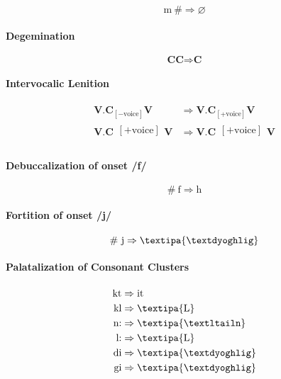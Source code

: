 \documentclass{report}
\begin{document}
\begin{equation}
  \text{m}\ \# \Rightarrow \varnothing
\end{equation}

\paragraph{Degemination}

\begin{equation}
  \textbf{CC} \Rightarrow \textbf{C}
\end{equation}

\paragraph{Intervocalic Lenition}

\begin{align}
  \textbf{V.C}_{[-\text{voice}]}\textbf{V} & \Rightarrow \textbf{V.C}_{[+\text{voice}]}\textbf{V} \\
  \textbf{V.C}\substack{[+\text{voice}] \\ [+\text{stop}]}\textbf{V} & \Rightarrow \textbf{V.C}\substack{[+\text{voice}] \\ [+\text{fricative}]}\textbf{V}
\end{align}

\paragraph{Debuccalization of onset /f/}

\begin{equation}
  \#\ \text{f} \Rightarrow \text{h}
\end{equation}

\paragraph{Fortition of onset /j/}

\begin{equation}
  \#\ \text{j} \Rightarrow \text{\textipa{\textdyoghlig}}
\end{equation}

\paragraph{Palatalization of Consonant Clusters}

\begin{align}
  \text{kt} & \Rightarrow \text{it} \\
  \text{kl} & \Rightarrow \text{\textipa{L}} \\
  \text{n:} & \Rightarrow \text{\textipa{\textltailn}} \\
  \text{l:} & \Rightarrow \text{\textipa{L}} \\
  \text{di} & \Rightarrow \text{\textipa{\textdyoghlig}} \\
  \text{gi} & \Rightarrow \text{\textipa{\textdyoghlig}}
\end{align}
\end{document}
